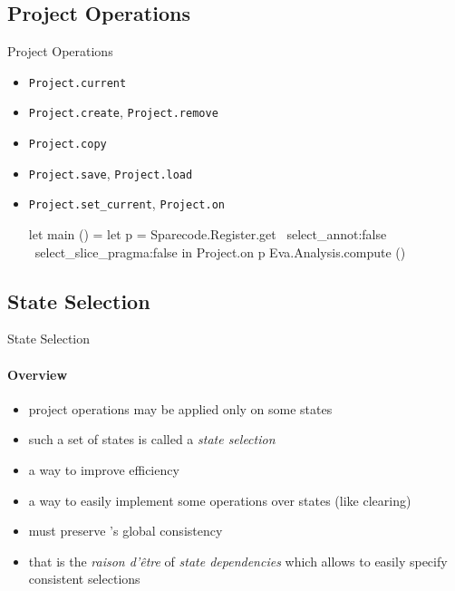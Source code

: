 
\subsection{Project Operations}

\begin{frame}[fragile]{Project Operations}

  \begin{itemize}
  \item \lstinline+Project.current+
  \item \lstinline+Project.create+, \lstinline+Project.remove+
  \item \lstinline+Project.copy+
  \item \lstinline+Project.save+, \lstinline+Project.load+
  \item  \lstinline+Project.set_current+, \lstinline+Project.on+
\begin{ocamlcode}
let main () =
  let p =
    Sparecode.Register.get
      ~select_annot:false
      ~select_slice_pragma:false
   in
   Project.on p Eva.Analysis.compute ()
\end{ocamlcode}
  \end{itemize}

\end{frame}


\subsection{State Selection}

\begin{frame}{State Selection}
  \framesubtitle{Overview}
  \begin{itemize}
  \item project operations may be applied only on some states
  \item such a set of states is called a \emph{state selection}
  \item a way to improve efficiency
  \item a way to easily implement some operations over states (like clearing)
  \item must preserve \framac's global consistency
  \item that is the \emph{raison d'\^etre} of \emph{state dependencies} which
    allows to easily specify consistent selections
  \end{itemize}
\end{frame}

